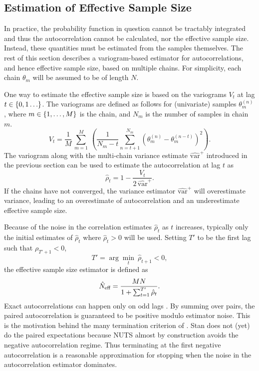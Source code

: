 \subsection{Estimation of Effective Sample Size}

In practice, the probability function in question cannot be tractably
integrated and thus the autocorrelation cannot be calculated, nor the
effective sample size.  Instead, these quantities must be estimated
from the samples themselves.  The rest of this section describes a
variogram-based estimator for autocorrelations, and hence effective sample
size, based on multiple chains. For simplicity, each chain
$\theta_m$ will be assumed to be of length $N$.

One way to estimate the effective sample size is based on the
variograms $V_t$ at lag $t \in \setlist{0,1\ldots}$.  The variograms are
defined as follows for (univariate) samples $\theta_m^{(n)}$, where $m \in
\setlist{1,\ldots,M}$ is the chain, and $N_m$ is the number of samples
in chain $m$.
\[
V_t =
\frac{1}{M}
\,
\sum_{m=1}^M
\
\left(
\frac{1}{N_m - t}
\sum_{n=t+1}^{N_m}
\left(
\theta_m^{(n)} - \theta_m^{(n-t)}
\right)^2
\right).
\]
%
The variogram along with the multi-chain variance estimate
$\widehat{\mbox{var}}^{+}$ introduced in the previous section can be
used to estimate the autocorrelation at lag $t$ as
\[
\hat{\rho}_t
= 1 - \frac{\displaystyle V_t}{
            \displaystyle 2 \, \widehat{\mbox{var}}^{+}}.
\]
If the chains have not converged, the variance estimator
$\widehat{\mbox{var}}^{+}$ will overestimate variance,
leading to an overestimate of autocorrelation and an underestimate
effective sample size.

Because of the noise in the correlation estimates $\hat{\rho}_t$ as $t$
increases, typically only the initial estimates of $\hat{\rho}_t$
where $\hat{\rho}_t > 0$ will be used.  Setting $T'$ to be the
first lag such that $\rho_{T' + 1} < 0$,
%
\[
T' = \arg\min_t \ \hat{\rho}_{t+1} < 0,
\]
the effective sample size estimator is defined as
\[
\hat{N}_{\mbox{\scriptsize eff}}
=
\frac{MN}
     {1 + \sum_{t=1}^{T'} \hat{\rho}_t}.
\]
%
Exact autocorrelations can happen only on odd lags \citep{Geyer:2011}.
By summing over pairs, the paired autocorrelation is guaranteed to be
positive modulo estimator noise.  This is the motivation behind the
many termination criterion of \cite{Geyer:2011}. Stan does not (yet)
do the paired expectations because NUTS almost by construction avoids
the negative autocorrelation regime.  Thus terminating at the first
negative autocorrelation is a reasonable approximation for stopping
when the noise in the autocorrelation estimator dominates.

